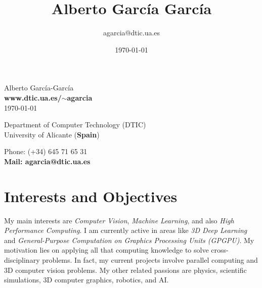 \documentclass[8pt]{article}
\title{\bfseries\Huge Alberto García García}
\author{agarcia@dtic.ua.es}
\date{\today}
\begin{document}
\begin{center}
	\Huge Alberto García-García\\
	\Large \textbf{www.dtic.ua.es/$\sim$agarcia}\\
	\today
\end{center}
\bigskip
\begin{minipage}[ht]{0.65\textwidth}
Department of Computer Technology (DTIC)\\
University of Alicante (\textbf{Spain})\\
\end{minipage}
\hfill
\begin{minipage}[ht]{0.3\textwidth}
Phone: (+34) 645 71 65 31\\
\textbf{Mail: agarcia@dtic.ua.es}\\
\end{minipage}
 
\section*{Interests and Objectives}

My main interests are \emph{Computer Vision}, \emph{Machine Learning}, and also \emph{High Performance Computing}. I am currently active in areas like \emph{3D Deep Learning} and \emph{General-Purpose Computation on Graphics Processing Units (GPGPU)}. My motivation lies on applying all that computing knowledge to solve cross-disciplinary problems. In fact, my current projects involve parallel computing and 3D computer vision problems. My other related passions are physics, scientific simulations, 3D computer graphics, robotics, and AI.
 
\end{document}
